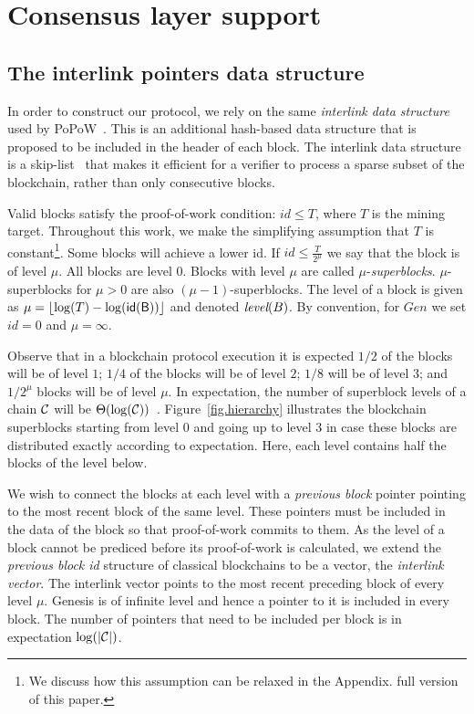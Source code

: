 \section{Consensus layer support} \label{sec:consensus}

\subsection{The interlink pointers data structure}
\label{sec:interlink}

In order to construct our protocol, we rely on the same \emph{interlink data
structure} used by PoPoW~\cite{KLS}. This is an additional hash-based data
structure that is proposed to be included in the header of each block. The
interlink data structure is a skip-list~\cite{skiplist} that makes it efficient
for a verifier to process a sparse subset of the blockchain, rather than only
consecutive blocks.

Valid blocks satisfy the proof-of-work condition: $id \leq T$, where $T$ is the
mining target. Throughout this work, we make the simplifying assumption that $T$
is constant\footnote{We discuss how this assumption can be relaxed in the
\ifhasappendix
Appendix.
\else
full version of this paper.
\fi}. Some blocks will achieve a lower id. If $id \leq
\frac{T}{2^\mu}$ we say that the block is of level $\mu$. All blocks are level
$0$. Blocks with level $\mu$ are called $\mu$-\emph{superblocks}.
$\mu$-superblocks for $\mu > 0$ are also $(\mu - 1)$-superblocks. The level of a
block is given as $\mu = \left \lfloor \log(T) - \log(\sf{id}(B)) \right
\rfloor$ and denoted $\emph{level}(B)$. By convention, for $Gen$ we set $id =
0$ and $\mu = \infty$.

Observe that in a blockchain protocol execution it is expected $1/2$ of the
blocks will be of level $1$; $1/4$ of the blocks will be of level $2$; $1/8$
will be of level $3$; and $1/2^\mu$ blocks will be of level $\mu$. In
expectation, the number of superblock levels of a chain $\mathcal{C}$ will be
$\Theta(\log(\mathcal{C}))$~\cite{KLS}. Figure~\ref{fig.hierarchy} illustrates the
blockchain superblocks starting from level $0$ and going up to level $3$ in case
these blocks are distributed exactly according to expectation. Here, each level
contains half the blocks of the level below.

We wish to connect the blocks at each level with a \emph{previous block}
pointer pointing to the most recent block of the same level. These pointers must
be included in the data of the block so that proof-of-work commits to them. As
the level of a block cannot be prediced before its proof-of-work is calculated,
we extend the \emph{previous block id} structure of classical blockchains to be
a vector, the \emph{interlink vector}. The interlink vector points to the most
recent preceding block of every level $\mu$. Genesis is of infinite level and
hence a pointer to it is included in every block. The number of pointers that
need to be included per block is in expectation $\log(|\mathcal{C}|)$.

